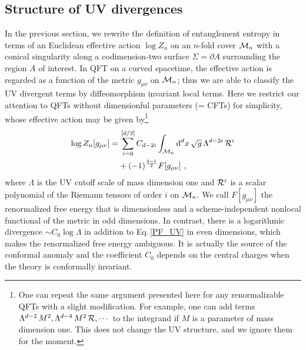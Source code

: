 \subsection{Structure of UV divergences}\label{ss:UVstructure}
In the previous section, we rewrite the definition of entanglement entropy in terms of an Euclidean effective action $\log Z_n$ on an $n$-fold cover ${\cal M}_n$ with a conical singularity along a codimension-two surface $\Sigma = \partial A$ surrounding the region $A$ of interest.
In QFT on a curved spacetime, the effective action is regarded as a function of the metric $g_{\mu\nu}$ on ${\cal M}_n$; thus we are able to classify the UV divergent terms by diffeomorphism invariant local terms.
Here we restrict our attention to QFTs without dimensionful parameters (= CFTs) for simplicity, whose effective action may be given by\footnote{One can repeat the same argument presented here for any renormalizable QFTs with a slight modification. For example, one can add terms $\Lambda^{d-2}\,M^2, \Lambda^{d-4}\, M^2\, {\cal R}, \cdots$ to the integrand if $M$ is a parameter of mass dimension one.
This does not change the UV structure, and we ignore them for the moment.
}
\begin{align}\label{PF_UV}
\begin{aligned}
\log Z_n [g_{\mu\nu}] =&\, \sum_{i=0}^{\left[ d/2\right]} C_{d-2i} \int_{{\cal M}_n} \mathrm{d}^d x\, \sqrt{g}\, \Lambda^{d-2i}\, {\cal R}^i \\
	& + (-1)^{\frac{d-1}{2}}F[g_{\mu\nu}] \ ,
\end{aligned}
\end{align}
where $\Lambda$ is the UV cutoff scale of mass dimension one and ${\cal R}^i$ is a scalar polynomial of the Riemann tensors of order $i$ on ${\cal M}_n$.
We call $F[g_{\mu\nu}]$ the renormalized free energy that is dimensionless and a scheme-independent nonlocal functional of the metric in odd dimensions.
In contrast, there is a logarithmic divergence $\sim C_0 \log \Lambda$ in addition to Eq.\,\eqref{PF_UV} in even dimensions, which makes the renormalized free energy ambiguous.
It is actually the source of the conformal anomaly and the coefficient $C_0$ depends on the central charges when the theory is conformally invariant.


